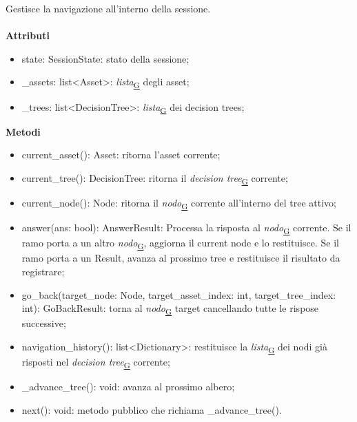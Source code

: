 \documentclass[a4paper,12pt]{article}
\begin{document}
                    Gestisce la navigazione all'interno della sessione.\\\\
                    \textbf{Attributi}
                    \begin{itemize}
                        \item {\ttfamily state: SessionState}: stato della sessione;
                        \item {\ttfamily \_assets: list<Asset>}: \textit{lista}\textsubscript{\href{https://atlasteam9.github.io/Atlas/glossario.html\#Lista}{G}} degli asset;
                        \item {\ttfamily \_trees: list<DecisionTree>}: \textit{lista}\textsubscript{\href{https://atlasteam9.github.io/Atlas/glossario.html\#Lista}{G}} dei decision trees;
                    \end{itemize}
                    \textbf{Metodi}
                    \begin{itemize}
                        \item {\ttfamily current\_asset(): Asset}: ritorna l'asset corrente;
                        \item {\ttfamily current\_tree(): DecisionTree}: ritorna il \textit{decision tree}\textsubscript{\href{https://atlasteam9.github.io/Atlas/glossario.html\#DecisionTree}{G}} corrente;
                        \item {\ttfamily current\_node(): Node}: ritorna il \textit{nodo}\textsubscript{\href{https://atlasteam9.github.io/Atlas/glossario.html\#Nodo}{G}} corrente all'interno del tree attivo;
                        \item {\ttfamily answer(ans: bool): AnswerResult}: Processa la risposta al \textit{nodo}\textsubscript{\href{https://atlasteam9.github.io/Atlas/glossario.html\#Nodo}{G}} corrente. Se il ramo porta a un altro \textit{nodo}\textsubscript{\href{https://atlasteam9.github.io/Atlas/glossario.html\#Nodo}{G}}, aggiorna il current node e lo restituisce. Se il ramo porta a un Result, avanza al prossimo tree e restituisce il risultato da registrare;
                        \item {\ttfamily go\_back(target\_node: Node, target\_asset\_index: int, target\_tree\_index: int): GoBackResult}: torna  al \textit{nodo}\textsubscript{\href{https://atlasteam9.github.io/Atlas/glossario.html\#Nodo}{G}} target cancellando tutte le rispose successive;
                        \item {\ttfamily navigation\_history(): list<Dictionary>}: restituisce la \textit{lista}\textsubscript{\href{https://atlasteam9.github.io/Atlas/glossario.html\#Lista}{G}} dei nodi già risposti nel \textit{decision tree}\textsubscript{\href{https://atlasteam9.github.io/Atlas/glossario.html\#DecisionTree}{G}} corrente;
                        \item {\ttfamily \_advance\_tree(): void}: avanza al prossimo albero;
                        \item {\ttfamily next(): void}: metodo pubblico che richiama {\ttfamily \_advance\_tree()}.
                    \end{itemize}
\end{document}
